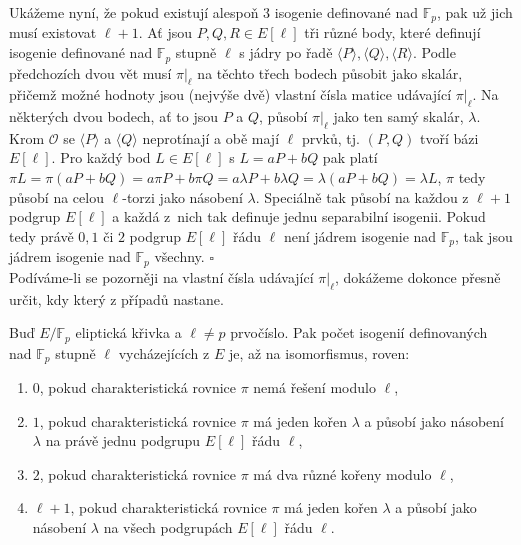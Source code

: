 \documentclass[12pt]{report}
\begin{document}
Ukážeme nyní, že pokud existují alespoň $3$ isogenie definované nad $\mathbb{F}_p$, pak už jich musí existovat $\ell+1$. Ať jsou $P,Q,R \in E[\ell]$ tři různé body, které definují isogenie definované nad $\mathbb{F}_p$ stupně $\ell$ s jádry po řadě $\langle P\rangle, \langle Q \rangle, \langle R \rangle$. Podle předchozích dvou vět musí $\pi\vert_\ell$ na těchto třech bodech působit jako skalár, přičemž možné hodnoty jsou (nejvýše dvě) vlastní čísla matice udávající $\pi \vert_{\ell}$. Na některých dvou bodech, ať to jsou $P$ a $Q$, působí $\pi \vert_{\ell}$ jako ten samý skalár, $\lambda$. Krom $\mathcal{O}$ se $\langle P \rangle$ a $\langle Q \rangle$ neprotínají a obě mají $\ell$ prvků, tj. $(P,Q)$ tvoří bázi $E[\ell]$. Pro každý bod $L \in E[\ell]$ s $L = aP+bQ$ pak platí $\pi L = \pi(aP+bQ) = a \pi P + b \pi Q = a \lambda P + b \lambda Q = \lambda(aP + bQ) = \lambda L$, $\pi$ tedy působí na celou $\ell$-torzi jako násobení $\lambda$. Speciálně tak působí na každou z $\ell+1$ podgrup $E[\ell]$ a každá z~nich tak definuje jednu separabilní isogenii. Pokud tedy právě $0,1$ či $2$ podgrup $E[\ell]$ řádu $\ell$ není jádrem isogenie nad $\mathbb{F}_p$, tak jsou jádrem isogenie nad $\mathbb{F}_p$ všechny. \hfill $\square$\\

Podíváme-li se pozorněji na vlastní čísla udávající $\pi \vert_{\ell}$, dokážeme dokonce přesně určit, kdy který z případů nastane.

\begin{veta}
Buď $E/\mathbb{F}_p$ eliptická křivka a $\ell \neq p$ prvočíslo. Pak počet isogenií definovaných nad $\mathbb{F}_p$ stupně $\ell$ vycházejících z $E$ je, až na isomorfismus, roven:
\begin{enumerate}
\item $0$, pokud charakteristická rovnice $\pi$ nemá řešení modulo $\ell$,
\item $1$, pokud charakteristická rovnice $\pi$ má jeden kořen $\lambda$ a působí jako násobení $\lambda$ na právě jednu podgrupu $E[\ell]$ řádu $\ell$,
\item $2$, pokud charakteristická rovnice $\pi$ má dva různé kořeny modulo $\ell$,
\item $\ell+1$, pokud charakteristická rovnice $\pi$ má jeden kořen $\lambda$ a působí jako násobení $\lambda$ na všech podgrupách $E[\ell]$ řádu $\ell$.
\end{enumerate}

\end{veta}
\end{document}
